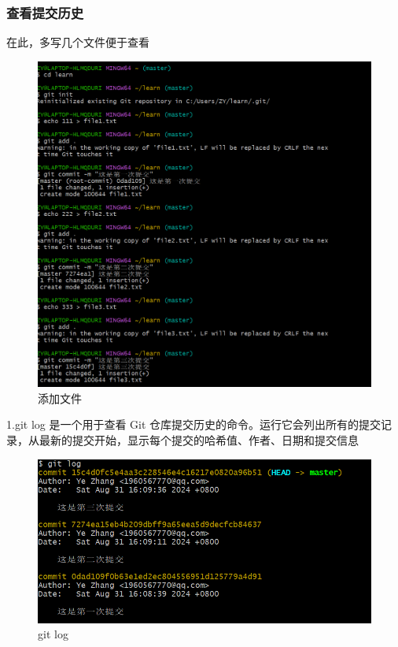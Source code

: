 \documentclass{ctexart}
\begin{document}
	
	\subsubsection{查看提交历史}
	
	在此，多写几个文件便于查看
	\begin{figure}[H]
		\centering
		\includegraphics[scale=0.5]{2}
		\caption{添加文件}
	\end{figure}
	
	1.git log 是一个用于查看 Git 仓库提交历史的命令。运行它会列出所有的提交记录，从最新的提交开始，显示每个提交的哈希值、作者、日期和提交信息
	\begin{figure}[H]
		\centering
		\includegraphics[scale=0.5]{3}
		\caption{git log}
	\end{figure}
	
\end{document}
